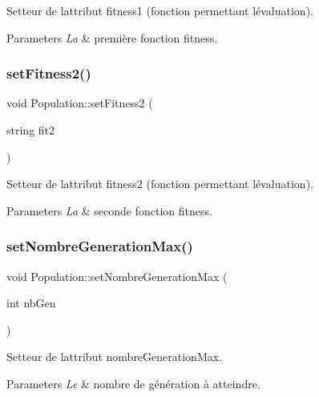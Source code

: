Setteur de l\textquotesingle{}attribut fitness1 (fonction permettant l\textquotesingle{}évaluation). 


\begin{DoxyParams}{Parameters}
{\em La} & première fonction fitness. \\
\hline
\end{DoxyParams}
\mbox{\label{class_population_af5940422c47c86ea6eb606224016d32d}} 
\subsubsection{\texorpdfstring{set\+Fitness2()}{setFitness2()}}
{\footnotesize\ttfamily void Population\+::set\+Fitness2 (\begin{DoxyParamCaption}\item[{string}]{fit2 }\end{DoxyParamCaption})}



Setteur de l\textquotesingle{}attribut fitness2 (fonction permettant l\textquotesingle{}évaluation). 


\begin{DoxyParams}{Parameters}
{\em La} & seconde fonction fitness. \\
\hline
\end{DoxyParams}
\mbox{\label{class_population_a85da2cfbfb4cde5c3ed879958385904c}} 
\subsubsection{\texorpdfstring{set\+Nombre\+Generation\+Max()}{setNombreGenerationMax()}}
{\footnotesize\ttfamily void Population\+::set\+Nombre\+Generation\+Max (\begin{DoxyParamCaption}\item[{int}]{nb\+Gen }\end{DoxyParamCaption})}



Setteur de l\textquotesingle{}attribut nombre\+Generation\+Max. 


\begin{DoxyParams}{Parameters}
{\em Le} & nombre de génération à atteindre. \\
\hline
\end{DoxyParams}
\mbox{\label{class_population_ac6f1644f7297b6b9521409b332f51f0d}} 
